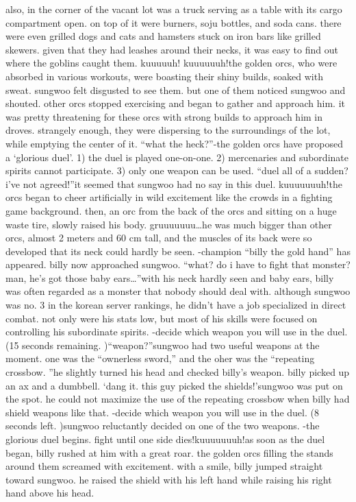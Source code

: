 also, in the corner of the vacant lot was a truck serving as a table with its cargo compartment open.
 on top of it were burners, soju bottles, and soda cans.
there were even grilled dogs and cats and hamsters stuck on iron bars like grilled skewers.
 given that they had leashes around their necks, it was easy to find out where the goblins caught them.
kuuuuuh! kuuuuuuh!the golden orcs, who were absorbed in various workouts, were boasting their shiny builds, soaked with sweat.
sungwoo felt disgusted to see them.
but one of them noticed sungwoo and shouted.
 other orcs stopped exercising and began to gather and approach him.
 it was pretty threatening for these orcs with strong builds to approach him in droves.
strangely enough, they were dispersing to the surroundings of the lot, while emptying the center of it.
“what the heck?”-the golden orcs have proposed a ‘glorious duel’.
1) the duel is played one-on-one.
2) mercenaries and subordinate spirits cannot participate.
3) only one weapon can be used.
“duel all of a sudden? i’ve not agreed!”it seemed that sungwoo had no say in this duel.
kuuuuuuuh!the orcs began to cheer artificially in wild excitement like the crowds in a fighting game background.
then, an orc from the back of the orcs and sitting on a huge waste tire, slowly raised his body.
gruuuuuuu…he was much bigger than other orcs, almost 2 meters and 60 cm tall, and the muscles of its back were so developed that its neck could hardly be seen.
-champion “billy the gold hand” has appeared.
billy now approached sungwoo.
“what? do i have to fight that monster? man, he’s got those baby ears…”with his neck hardly seen and baby ears, billy was often regarded as a monster that nobody should deal with.
although sungwoo was no.
 3 in the korean server rankings, he didn’t have a job specialized in direct combat.
 not only were his stats low, but most of his skills were focused on controlling his subordinate spirits.
-decide which weapon you will use in the duel.
 (15 seconds remaining.
)“weapon?”sungwoo had two useful weapons at the moment.
 one was the “ownerless sword,” and the oher was the “repeating crossbow.
”he slightly turned his head and checked billy’s weapon.
 billy picked up an ax and a dumbbell.
‘dang it.
 this guy picked the shields!’sungwoo was put on the spot.
 he could not maximize the use of the repeating crossbow when billy had shield weapons like that.
-decide which weapon you will use in the duel.
 (8 seconds left.
)sungwoo reluctantly decided on one of the two weapons.
-the glorious duel begins.
 fight until one side dies!kuuuuuuuh!as soon as the duel began, billy rushed at him with a great roar.
 the golden orcs filling the stands around them screamed with excitement.
with a smile, billy jumped straight toward sungwoo.
 he raised the shield with his left hand while raising his right hand above his head.


